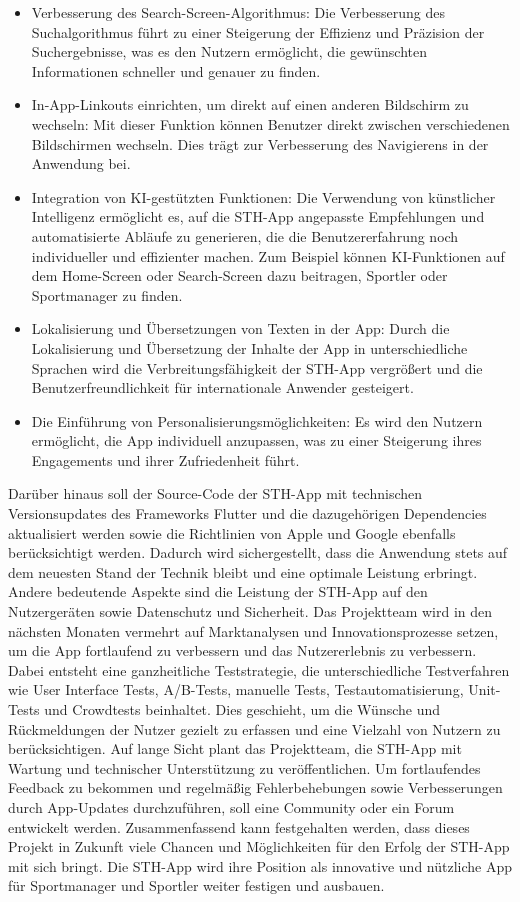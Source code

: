 \begin{itemize}
\item Verbesserung des Search-Screen-Algorithmus: Die Verbesserung des Suchalgorithmus führt zu einer Steigerung der Effizienz und Präzision der Suchergebnisse, was es den Nutzern ermöglicht, die gewünschten Informationen schneller und genauer zu finden.
\item In-App-Linkouts einrichten, um direkt auf einen anderen Bildschirm zu wechseln: Mit dieser Funktion können Benutzer direkt zwischen verschiedenen Bildschirmen wechseln. Dies trägt zur Verbesserung des Navigierens in der Anwendung bei.
\item Integration von KI-gestützten Funktionen: Die Verwendung von künstlicher Intelligenz ermöglicht es, auf die STH-App angepasste Empfehlungen und automatisierte Abläufe zu generieren, die die Benutzererfahrung noch individueller und effizienter machen. Zum Beispiel können KI-Funktionen auf dem Home-Screen oder Search-Screen dazu beitragen, Sportler oder Sportmanager zu finden.
\item Lokalisierung und Übersetzungen von Texten in der App: Durch die Lokalisierung und Übersetzung der Inhalte der App in unterschiedliche Sprachen wird die Verbreitungsfähigkeit der STH-App vergrößert und die Benutzerfreundlichkeit für internationale Anwender gesteigert.
\item Die Einführung von Personalisierungsmöglichkeiten: Es wird den Nutzern ermöglicht, die App individuell anzupassen, was zu einer Steigerung ihres Engagements und ihrer Zufriedenheit führt.
\end{itemize}
Darüber hinaus soll der Source-Code der STH-App mit technischen Versionsupdates des Frameworks Flutter und die dazugehörigen Dependencies aktualisiert werden sowie die Richtlinien von Apple und Google ebenfalls berücksichtigt werden. Dadurch wird sichergestellt, dass die Anwendung stets auf dem neuesten Stand der Technik bleibt und eine optimale Leistung erbringt.
Andere bedeutende Aspekte sind die Leistung der STH-App auf den Nutzergeräten sowie Datenschutz und Sicherheit. 
Das Projektteam wird in den nächsten Monaten vermehrt auf Marktanalysen und Innovationsprozesse setzen, um die App fortlaufend zu verbessern und das Nutzererlebnis zu verbessern. Dabei entsteht eine ganzheitliche Teststrategie, die unterschiedliche Testverfahren wie User Interface Tests, A/B-Tests, manuelle Tests, Testautomatisierung, Unit-Tests und Crowdtests beinhaltet. Dies geschieht, um die Wünsche und Rückmeldungen der Nutzer gezielt zu erfassen und eine Vielzahl von Nutzern zu berücksichtigen.
Auf lange Sicht plant das Projektteam, die STH-App mit Wartung und technischer Unterstützung zu veröffentlichen. Um fortlaufendes Feedback zu bekommen und regelmäßig Fehlerbehebungen sowie Verbesserungen durch App-Updates durchzuführen, soll eine Community oder ein Forum entwickelt werden. \newline
Zusammenfassend kann festgehalten werden, dass dieses Projekt in Zukunft viele Chancen und Möglichkeiten für den Erfolg der STH-App mit sich bringt. Die STH-App wird ihre Position als innovative und nützliche App für Sportmanager und Sportler weiter festigen und ausbauen.

